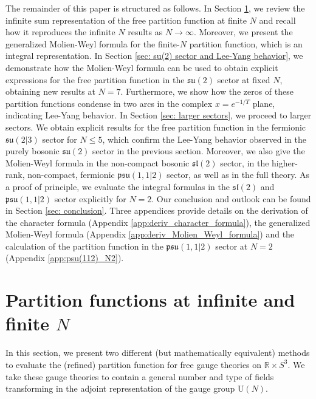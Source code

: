 \documentclass[a4paper,11pt]{article}
\begin{document}
The remainder of this paper is structured as follows. In Section \ref{sec: partition functions}, we review the infinite sum representation of the free partition function at finite $N$ and recall how it reproduces the infinite $N$ results as $N\to\infty$. Moreover, we present the generalized Molien-Weyl formula for the finite-$N$ partition function, which is an integral representation.
In Section \ref{sec: su(2) sector and Lee-Yang behavior}, we demonstrate how the Molien-Weyl formula can be used to obtain explicit expressions for the free partition function in the $\mathfrak{su}(2)$ sector at fixed $N$, obtaining new results at $N=7$. Furthermore, we show how the zeros of these partition functions condense in two arcs in the complex $x=e^{-1/T}$ plane, indicating Lee-Yang behavior.
In Section \ref{sec: larger sectors}, we proceed to larger sectors. We obtain explicit results for the free partition function in the fermionic $\mathfrak{su}(2|3)$ sector for $N\leq5$, which confirm the Lee-Yang behavior observed in the purely bosonic $\mathfrak{su}(2)$ sector in the previous section. Moreover, we also give the Molien-Weyl formula in the non-compact bosonic $\mathfrak{sl}(2)$ sector, in the higher-rank, non-compact, fermionic $\mathfrak{psu}(1,1|2)$ sector, as well as in the full theory. As a proof of principle, we evaluate the integral formulas in the $\mathfrak{sl}(2)$ and $\mathfrak{psu}(1,1|2)$ sector explicitly for $N=2$.
Our conclusion and outlook can be found in Section \ref{sec: conclusion}.
Three appendices provide details on the derivation of the character formula (Appendix \ref{app:deriv_character_formula}), the generalized Molien-Weyl formula (Appendix \ref{app:deriv_Molien_Weyl_formula}) and the calculation of the partition function in the $\mathfrak{psu}(1,1|2)$ sector at $N=2$ (Appendix \ref{app:psu(112)_N2}).



\section{Partition functions at infinite and finite \texorpdfstring{$N$}{N}}
\label{sec: partition functions}

In this section, we present two different (but mathematically equivalent) methods to evaluate the (refined) partition function for free gauge theories on $\mathbb{R} \times S^3$. We take these gauge theories to contain a general number and type of fields transforming in the adjoint representation of the gauge group $\text{U}(N)$.
\end{document}
